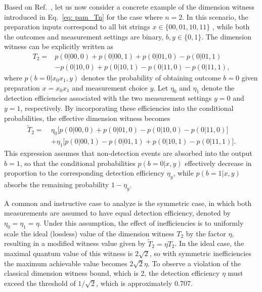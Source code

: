 \documentclass[aps,pra,reprint, superscriptaddress,showkeys]{revtex4-2}
\theoremstyle{plain}
\begin{document}
Based on Ref.~\cite{li2015}, let us now consider a concrete example of the dimension witness introduced in Eq.~\eqref{eq: pam_Tn} for the case where $ n=2$. In this scenario, the preparation inputs correspond to all bit strings $ x \in \{00, 01, 10, 11\}$ , while both the outcomes and measurement settings are binary, $ b,y \in \{0,1\} $. The dimension witness can be explicitly written as
\begin{equation}
\begin{aligned}
    T_2 = & p(0|00,0) + p(0|00,1) + p(0|01,0) - p(0|01,1) \\
    & - p(0|10,0) + p(0|10,1) - p(0|11,0) - p(0|11,1),
    \label{eq:pamT2}
\end{aligned}
\end{equation}
where \( p(b=0|x_0x_1, y) \) denotes the probability of obtaining outcome \( b=0 \) given preparation \( x = x_0x_1\) and measurement choice \( y \). Let \(\eta_0\) and \(\eta_1\) denote the detection efficiencies associated with the two measurement settings \(y = 0\) and \(y = 1\), respectively. By incorporating these efficiencies into the conditional probabilities, the effective dimension witness becomes
\begin{align}
    \tilde{T}_2 =\ & \eta_0 \big[ p(0|00,0) + p(0|01,0) - p(0|10,0) - p(0|11,0) \big] \nonumber \\
    & + \eta_1 \big[ p(0|00,1) - p(0|01,1) + p(0|10,1) - p(0|11,1) \big].
\end{align}
This expression assumes that non-detection events are absorbed into the output \(b=1\), so that the conditional probabilities \(p(b=0|x,y)\) effectively decrease in proportion to the corresponding detection efficiency \(\eta_y\), while \(p(b=1|x,y)\) absorbs the remaining probability \(1 - \eta_y\).

A common and instructive case to analyze is the symmetric case, in which both measurements are assumed to have equal detection efficiency, denoted by \(\eta_0 = \eta_1 = \eta\). Under this assumption, the effect of inefficiencies is to uniformly scale the ideal (lossless) value of the dimension witness \(T_2\) by the factor \(\eta\), resulting in a modified witness value given by \(\tilde{T}_2 = \eta T_2\). In the ideal case, the maximal quantum value of this witness is \(2\sqrt{2}\), so with symmetric inefficiencies the maximum achievable value becomes \(2\sqrt{2}\eta\). To observe a violation of the classical dimension witness bound, which is 2, the detection efficiency \(\eta\) must exceed the threshold of \(1/\sqrt{2}\), which is approximately 0.707.
\end{document}

